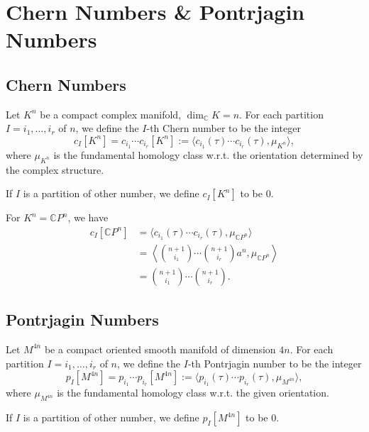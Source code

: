 \section{Chern Numbers \& Pontrjagin Numbers}
\label{sec:ChernNumbers&PontrjaginNumbers}

\subsection{Chern Numbers}
\begin{definition}
    Let $K^n$ be a compact complex manifold, 
    $\dim_\mathbb{C}K=n$. 
    For each partition $I=i_1,\dots,i_r$ of $n$, 
    we define the $I$-th Chern number to be the integer 
    \begin{equation*}
        c_I[K^n]=c_{i_1}\cdots c_{i_r}[K^n]
        :=\langle c_{i_1}(\tau)\cdots c_{i_r}(\tau),\mu_{K^n}\rangle,
    \end{equation*}
    where $\mu_{K^n}$ is the fundamental homology class w.r.t. 
    the orientation determined by the complex structure.

    If $I$ is a partition of other number, we define $c_I[K^n]$ to be $0$. 
\end{definition}

\begin{example}
    For $K^n=\mathbb{C}P^n$, we have
    \begin{align*}
        c_I[\mathbb{C}P^n] 
        &= \langle c_{i_1}(\tau)\cdots c_{i_r}(\tau),
        \mu_{\mathbb{C}P^n}\rangle \\
        &=\left\langle\binom{n+1}{i_1}\cdots\binom{n+1}{i_r}a^n,
        \mu_{\mathbb{C}P^n}\right\rangle \\
        &=\binom{n+1}{i_1}\cdots\binom{n+1}{i_r}.
    \end{align*}
\end{example}

\subsection{Pontrjagin Numbers}
\begin{definition}
    Let $M^{4n}$ be a compact oriented smooth manifold of dimension $4n$. 
    For each partition $I=i_1,\dots,i_r$ of $n$, 
    we define the $I$-th Pontrjagin number to be the integer 
    \begin{equation*}
        p_I[M^{4n}]=p_{i_1}\cdots p_{i_r}[M^{4n}]
        :=\langle p_{i_1}(\tau)\cdots p_{i_r}(\tau),\mu_{M^{4n}}\rangle,
    \end{equation*}
    where $\mu_{M^{4n}}$ is the fundamental homology class w.r.t. 
    the given orientation.

    If $I$ is a partition of other number, 
    we define $p_I[M^{4n}]$ to be $0$.
\end{definition}

